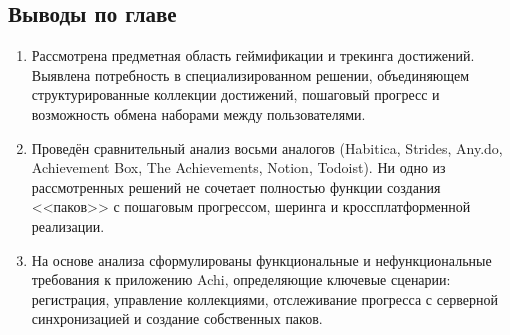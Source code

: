 \documentclass[../main.tex]{subfiles}
\begin{document}
\subsection{Выводы по главе}

\begin{enumerate}[leftmargin=*]
	\item Рассмотрена предметная область геймификации и трекинга достижений. Выявлена потребность в специализированном решении, объединяющем структурированные коллекции достижений, пошаговый прогресс и возможность обмена наборами между пользователями.
	\item Проведён сравнительный анализ восьми аналогов (Habitica, Strides, Any.do, Achievement Box, The Achievements, Notion, Todoist). Ни одно из рассмотренных решений не сочетает полностью функции создания <<паков>> с пошаговым прогрессом, шеринга и кроссплатформенной реализации.
	\item На основе анализа сформулированы функциональные и нефункциональные требования к приложению Achi, определяющие ключевые сценарии: регистрация, управление коллекциями, отслеживание прогресса с серверной синхронизацией и создание собственных паков.
\end{enumerate}
\end{document}
